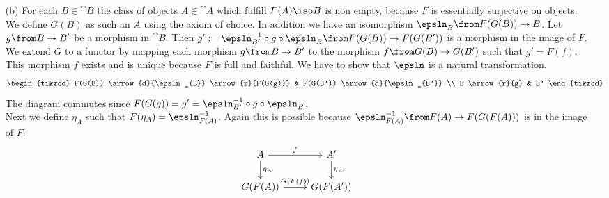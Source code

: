 \begin{answer}
\begin{itemize}
        \item[(b)]
            For each $B \in \cat{B}$ the class of objects $A \in \cat{A}$ which fulfill $F(A) \iso B$ is non empty, because $F$ is essentially surjective on objects.
            We define $G(B)$ as such an $A$ using the axiom of choice.
            In addition we have an isomorphism $\epsln_B\from F(G(B)) \to B$.
            Let $g\from B \to B'$ be a morphism in $\cat{B}$.
            Then $g' := \epsln_{B'}^{-1} \circ g \circ \epsln_{B} \from F(G(B)) \to F(G(B'))$ is a morphism in the image of $F$.
            We extend $G$ to a functor by mapping each morphism $g\from B \to B'$ to the morphism $f\from G(B) \to G(B')$ such that $g' = F(f)$.
            This morphism $f$ exists and is unique because $F$ is full and faithful.
            We have to show that $\epsln$ is a natural transformation.
            \[
                \begin{tikzcd}
                    F(G(B)) \arrow{d}{\epsln_{B}} \arrow{r}{F(G(g))} & F(G(B')) \arrow{d}{\epsln_{B'}} \\
                    B \arrow{r}{g}                                   & B'
                \end{tikzcd}
            \]
            The diagram commutes since $F(G(g)) = g' = \epsln_{B'}^{-1} \circ g \circ \epsln_{B}$.\\
            Next we define $\eta_A$ such that $F(\eta_A) = \epsln_{F(A)}^{-1}$.
            Again this is possible because $\epsln_{F(A)}^{-1}\from F(A) \to F(G(F(A)))$ is in the image of $F$.
            \[
                \begin{tikzcd}
                    A \arrow{d}{\eta_A} \arrow{r}{f} & A' \arrow{d}{\eta_{A'}} \\
                    G(F(A)) \arrow{r}{G(F(f))}       & G(F(A'))

\end{tikzcd}\]
\end{itemize}
\end{answer}
